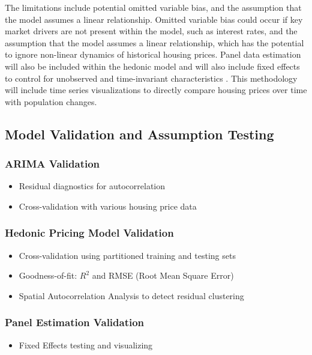 \documentclass[journal,article,submit,pdftex,moreauthors]{Definitions/mdpi}
\begin{document}
The limitations include potential omitted variable bias, and the assumption that the model assumes a linear relationship. Omitted variable bias could occur if key market drivers are not present within the model, such as interest rates, and the assumption that the model assumes a linear relationship, which has the potential to ignore non-linear dynamics of historical housing prices. Panel data estimation will also be included within the hedonic model and will also include fixed effects to control for unobserved and time-invariant characteristics \citep{torresreyna_2010_getting}. This methodology will include time series visualizations to directly compare housing prices over time with population changes.

\subsection{Model Validation and Assumption Testing}

\subsubsection*{ARIMA Validation}
\begin{itemize}
    \item Residual diagnostics for autocorrelation
    \item Cross-validation with various housing price data
\end{itemize}

\subsubsection*{Hedonic Pricing Model Validation}
\begin{itemize}
    \item Cross-validation using partitioned training and testing sets
    \item Goodness-of-fit: $R^2$ and RMSE (Root Mean Square Error)
    \item Spatial Autocorrelation Analysis to detect residual clustering \citep{aladwan_2019_hedonic}
\end{itemize}

\subsubsection*{Panel Estimation Validation}
\begin{itemize}
    \item Fixed Effects testing and visualizing \citep{torresreyna_2010_getting} 
\end{itemize}
\end{document}
